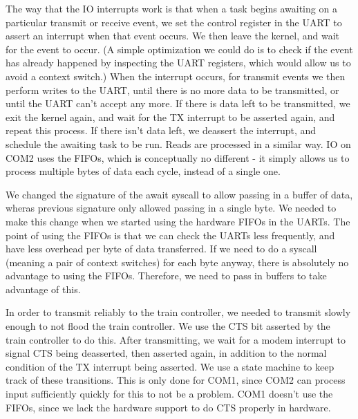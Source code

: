 \documentclass[titlepage]{article}
\begin{document}
The way that the IO interrupts work is that when a task begins awaiting on a particular
transmit or receive event, we set the control register in the UART to assert an interrupt
when that event occurs.
We then leave the kernel, and wait for the event to occur.
(A simple optimization we could do is to check if the event has already happened by
inspecting the UART registers, which would allow us to avoid a context switch.)
When the interrupt occurs, for transmit events we then perform writes to the UART,
until there is no more data to be transmitted, or until the UART can't accept any more.
If there is data left to be transmitted, we exit the kernel again, and wait for the TX
interrupt to be asserted again, and repeat this process.
If there isn't data left, we deassert the interrupt, and schedule the awaiting task
to be run.
Reads are processed in a similar way.
IO on COM2 uses the FIFOs, which is conceptually no different - it simply allows
us to process multiple bytes of data each cycle, instead of a single one.

We changed the signature of the await syscall to allow passing in a buffer of data,
wheras previous signature only allowed passing in a single byte.
We needed to make this change when we started using the hardware FIFOs in the UARTs.
The point of using the FIFOs is that we can check the UARTs less frequently, and have
less overhead per byte of data transferred.
If we need to do a syscall (meaning a pair of context switches) for each byte anyway,
there is absolutely no advantage to using the FIFOs.
Therefore, we need to pass in buffers to take advantage of this.

In order to transmit reliably to the train controller, we needed to transmit slowly
enough to not flood the train controller.
We use the CTS bit asserted by the train controller to do this.
After transmitting, we wait for a modem interrupt to signal CTS being deasserted, then
asserted again, in addition to the normal condition of the TX interrupt being asserted.
We use a state machine to keep track of these transitions.
This is only done for COM1, since COM2 can process input sufficiently quickly for
this to not be a problem.
COM1 doesn't use the FIFOs, since we lack the hardware support to do CTS properly
in hardware.
\end{document}
